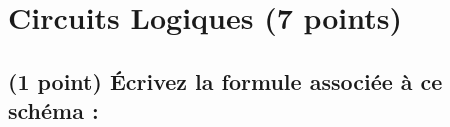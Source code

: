 \documentclass[11pt,a4paper]{article}
\begin{document}
\section{Circuits Logiques (7 points)}

\subsection{(1 point) \'Ecrivez la formule associée à ce schéma : }

\smallskip

\begin{figure}[ht!]
\end{figure}


\vspace*{1.5cm}


\end{document}
